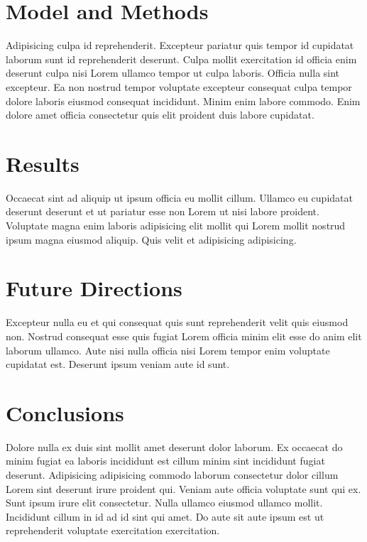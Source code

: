 \section{Model and Methods}

Adipisicing culpa id reprehenderit. Excepteur pariatur quis tempor id cupidatat laborum sunt id reprehenderit deserunt. Culpa mollit exercitation id officia enim deserunt culpa nisi Lorem ullamco tempor ut culpa laboris. Officia nulla sint excepteur. Ea non nostrud tempor voluptate excepteur consequat culpa tempor dolore laboris eiusmod consequat incididunt. Minim enim labore commodo. Enim dolore amet officia consectetur quis elit proident duis labore cupidatat.

\section{Results}

Occaecat sint ad aliquip ut ipsum officia eu mollit cillum. Ullamco eu cupidatat deserunt deserunt et ut pariatur esse non Lorem ut nisi labore proident. Voluptate magna enim laboris adipisicing elit mollit qui Lorem mollit nostrud ipsum magna eiusmod aliquip. Quis velit et adipisicing adipisicing.

\section{Future Directions}

Excepteur nulla eu et qui consequat quis sunt reprehenderit velit quis eiusmod non. Nostrud consequat esse quis fugiat Lorem officia minim elit esse do anim elit laborum ullamco. Aute nisi nulla officia nisi Lorem tempor enim voluptate cupidatat est. Deserunt ipsum veniam aute id sunt.

\section{Conclusions}

Dolore nulla ex duis sint mollit amet deserunt dolor laborum. Ex occaecat do minim fugiat ea laboris incididunt est cillum minim sint incididunt fugiat deserunt. Adipisicing adipisicing commodo laborum consectetur dolor cillum Lorem sint deserunt irure proident qui. Veniam aute officia voluptate sunt qui ex. Sunt ipsum irure elit consectetur. Nulla ullamco eiusmod ullamco mollit. Incididunt cillum in id ad id sint qui amet. Do aute sit aute ipsum est ut reprehenderit voluptate exercitation exercitation.

